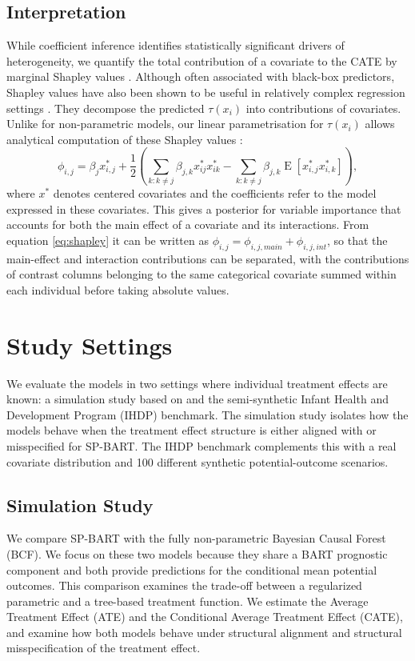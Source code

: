 \documentclass[12pt]{article}
\newcommand{\rev}[1]{\ifdefined\ReviewChanges{\color{revisionblue}#1}\else#1\fi}
\begin{document}
\subsection{Interpretation}
\label{subsec:shapley}
While coefficient inference identifies statistically significant drivers of heterogeneity, we quantify the total contribution of a covariate to the CATE by marginal Shapley values \citep{aas2021explaining}. Although often associated with black-box predictors, Shapley values have also been shown to be useful in relatively complex regression settings \citep{van2024linked}. They decompose the predicted $\tau(x_i)$ into contributions of covariates. Unlike for non-parametric models, our linear parametrisation for $\tau(x_i)$ allows analytical computation of these Shapley values \citep{van2024linked}:
\begin{equation}
\label{eq:shapley}
    \phi_{i,j} = \beta_j x^*_{i,j} + \frac{1}{2} \left( \sum_{k:k \neq j} \beta_{j,k} x^*_{ij} x^*_{ik} - \sum_{k:k \neq j} \beta_{j,k} \operatorname{E}[x^*_{i,j}x^*_{i,k}] \right),
\end{equation}
where $x^*$ denotes centered covariates and the coefficients refer to the model expressed in these covariates. This gives a posterior for variable importance that accounts for both the main effect of a covariate and its interactions. From equation \eqref{eq:shapley} it can be written as $\phi_{i,j} = \phi_{i,j,main} + \phi_{i,j,int}$, so that the main-effect and interaction contributions can be separated, with the contributions of contrast columns belonging to the same categorical covariate summed within each individual before taking absolute values.

\section{Study Settings}
\label{sec:study_settings}
We evaluate the models in two settings where individual treatment effects are known: a simulation study based on \cite{hahn2020bayesian} and the semi-synthetic Infant Health and Development Program (IHDP) benchmark. The simulation study isolates how the models behave when the treatment effect structure is either aligned with or misspecified for \rev{SP-BART}. The IHDP benchmark complements this with a real covariate distribution and 100 different synthetic potential-outcome scenarios.

\subsection{Simulation Study}
\label{sec:simulation}
We compare \rev{SP-BART} with the fully non-parametric Bayesian Causal Forest (BCF). We focus on these two models because they share a BART prognostic component and both provide predictions for the conditional mean potential outcomes. This comparison examines the trade-off between a regularized parametric and a tree-based treatment function. We estimate the Average Treatment Effect (ATE) and the Conditional Average Treatment Effect (CATE), and examine how both models behave under structural alignment and structural misspecification of the treatment effect.
\end{document}
